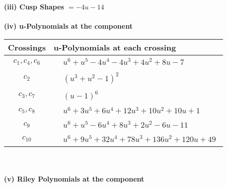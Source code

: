 \documentclass[1p]{elsarticle_modified}
\theoremstyle{definition}
\begin{document}
\flushleft \textbf{(iii) Cusp Shapes $= -4 u-14$}\\~\\
\newpage\renewcommand{\arraystretch}{1}
\flushleft \textbf{(iv) u-Polynomials at the component}\newline \\
\begin{tabular}{m{50pt}|m{274pt}}
Crossings & \hspace{64pt}u-Polynomials at each crossing \\
\hline $$\begin{aligned}c_{1},c_{4},c_{6}\end{aligned}$$&$\begin{aligned}
&u^6+u^5-4 u^4-4 u^3+4 u^2+8 u-7
\end{aligned}$\\
\hline $$\begin{aligned}c_{2}\end{aligned}$$&$\begin{aligned}
&(u^3+u^2-1)^2
\end{aligned}$\\
\hline $$\begin{aligned}c_{3},c_{7}\end{aligned}$$&$\begin{aligned}
&(u-1)^6
\end{aligned}$\\
\hline $$\begin{aligned}c_{5},c_{8}\end{aligned}$$&$\begin{aligned}
&u^6+3 u^5+6 u^4+12 u^3+10 u^2+10 u+1
\end{aligned}$\\
\hline $$\begin{aligned}c_{9}\end{aligned}$$&$\begin{aligned}
&u^6+u^5-6 u^4+8 u^3+2 u^2-6 u-11
\end{aligned}$\\
\hline $$\begin{aligned}c_{10}\end{aligned}$$&$\begin{aligned}
&u^6+9 u^5+32 u^4+78 u^3+136 u^2+120 u+49
\end{aligned}$\\
\hline
\end{tabular}\\~\\
\newpage\renewcommand{\arraystretch}{1}
\flushleft \textbf{(v) Riley Polynomials at the component}\newline \\
\end{document}
